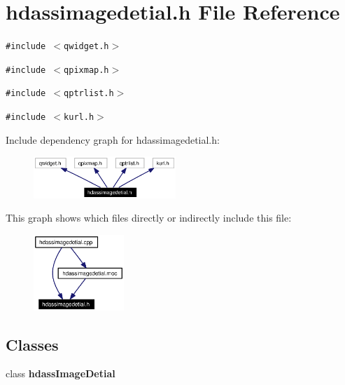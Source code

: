\section{hdassimagedetial.h File Reference}
\label{hdassimagedetial_8h}


{\tt \#include $<$qwidget.h$>$}\par
{\tt \#include $<$qpixmap.h$>$}\par
{\tt \#include $<$qptrlist.h$>$}\par
{\tt \#include $<$kurl.h$>$}\par


Include dependency graph for hdassimagedetial.h:\begin{figure}[H]
\begin{center}
\leavevmode
\includegraphics[width=152pt]{hdassimagedetial_8h__incl}
\end{center}
\end{figure}


This graph shows which files directly or indirectly include this file:\begin{figure}[H]
\begin{center}
\leavevmode
\includegraphics[width=97pt]{hdassimagedetial_8h__dep__incl}
\end{center}
\end{figure}
\subsection*{Classes}
\begin{CompactItemize}
\item 
class {\bf hdass\-Image\-Detial}
\end{CompactItemize}
